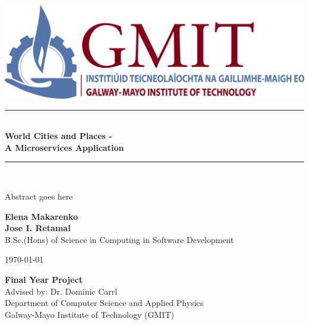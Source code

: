 \documentclass[11pt,a4paper,oneside,openany]{book}
\newcommand{\projecttitle}{ World Cities and Places - \\ A Microservices Application}
\newcommand{\projectauthor}{Elena Makarenko  \\[0.2cm] Jose I. Retamal}
\newcommand{\projectadvisor}{Dr. Dominic Carrl}
\newcommand{\projectprogramme}{B.Sc.(Hons) of Science in Computing in Software Development}
\newcommand{\projectabstract}{Abstract goes here}
\newcommand{\projectdate}{\today}
\begin{document}
  \begin{titlepage}
  	 \begin{center}    
  		\includegraphics{img/gmit-logo.jpg}
  	\end{center}
    \begin{minipage}[t][4cm]{\textwidth}
      \centering
      \rule{\linewidth}{0.5mm} \\[0.4cm]
      { \LARGE \bfseries \projecttitle \\[0.4cm] }
      \rule{\linewidth}{0.5mm} \\[0.8cm]
    \end{minipage}
    
      \begin{minipage}[t][5.5cm]{\textwidth}
    	\centering
    	
    	\projectabstract
    \end{minipage}
    
    \begin{minipage}[t][3.5cm]{\textwidth}
      \centering
      \textbf{\projectauthor}\\[0.5cm]
      \projectprogramme
    \end{minipage}
   

  
    \begin{minipage}[t][1cm]{\textwidth}
      \centering
      \textsc{\projectdate}
    \end{minipage}
      
    \begin{minipage}[t][3cm]{\textwidth}
      \centering
      \textbf{Final Year Project}\\[0.3cm]
      Advised by: \projectadvisor \\[0.1cm]
      Department of Computer Science and Applied Physics\\
      Galway-Mayo Institute of Technology (GMIT)
    \end{minipage}
  
   
  \end{titlepage}
   
  \setcounter{page}{2}
  \tableofcontents
  \listoffigures
  
    
 
  
  
  
  
  
  
  
  
\end{document}

